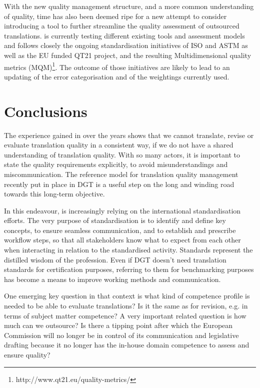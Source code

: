 \documentclass[output=paper]{langsci/langscibook}
\begin{document}
With the new quality management structure, and a more common understanding of quality, time has also been deemed ripe for a new attempt to consider introducing a tool to further streamline the quality assessment of outsourced translations. \citeauthor{DGT2016a} is currently testing different existing tools and assessment models and follows closely the ongoing standardisation initiatives of ISO and ASTM as well as the EU funded QT21 project, and the resulting Multidimensional quality metrics (MQM)\footnote{http://www.qt21.eu/quality-metrics/}. The outcome of those initiatives are likely to lead to an updating of the error categorisation and of the weightings currently used.

\section{Conclusions}\label{sec:strandvik:7}

The experience gained in \citeauthor{DGT2016a} over the years shows that we cannot translate, revise or evaluate translation quality in a consistent way, if we do not have a shared understanding of translation quality. With so many actors, it is important to state the quality requirements explicitly, to avoid misunderstandings and miscommunication. The reference model for translation quality management recently put in place in DGT is a useful step on the long and winding road towards this long-term objective. 

In this endeavour, \citeauthor{DGT2016a} is increasingly relying on the international standardisation efforts. The very purpose of standardisation is to identify and define key concepts, to ensure seamless communication, and to establish and prescribe workflow steps, so that all stakeholders know what to expect from each other when interacting in relation to the standardised activity. Standards represent the distilled wisdom of the profession. Even if DGT doesn't need translation standards for certification purposes, referring to them for benchmarking purposes has become a means to improve working methods and communication. 

One emerging key question in that context is what kind of competence profile is needed to be able to evaluate translations? Is it the same as for revision, e.g. in terms of subject matter competence? A very important related question is how much can we outsource? Is there a tipping point after which the European Commission will no longer be in control of its communication and legislative drafting because it no longer has the in-house domain competence to assess and ensure quality? 
\end{document}
